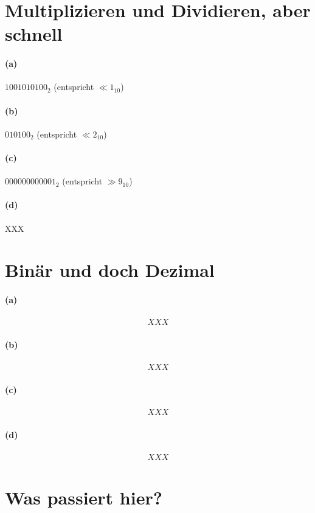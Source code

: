 \documentclass[a4paper]{article}
\begin{document}
\section{Multiplizieren und Dividieren, aber schnell}
\paragraph{(a)}
$1001010100_{2}$ (entspricht $\ll 1_{10}$)
\paragraph{(b)}
$010100_{2}$ (entspricht $\ll 2_{10}$)
\paragraph{(c)}
$000000000001_{2}$ (entspricht $\gg 9_{10}$)
\paragraph{(d)}
XXX


\section{Binär und doch Dezimal}
\paragraph{(a)}
\begin{align*}
XXX
\end{align*}
\paragraph{(b)}
\begin{align*}
XXX
\end{align*}
\paragraph{(c)}
\begin{align*}
XXX
\end{align*}
\paragraph{(d)}
\begin{align*}
XXX
\end{align*}


\section{Was passiert hier?}
\end{document}
